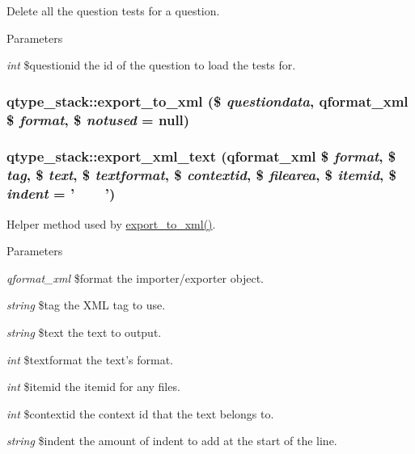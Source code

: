 \label{classqtype__stack_aa04a9197ef37eff57dca6ca2a04f5d83}
Delete all the question tests for a question. 
\begin{DoxyParams}{Parameters}
\item[{\em int}]\$questionid the id of the question to load the tests for. \end{DoxyParams}
\hypertarget{classqtype__stack_abb4e2b1212e53ee6c4a36f2315d3e085}{
\subsubsection[{export\_\-to\_\-xml}]{\setlength{\rightskip}{0pt plus 5cm}qtype\_\-stack::export\_\-to\_\-xml (\$ {\em questiondata}, \/  qformat\_\-xml \$ {\em format}, \/  \$ {\em notused} = {\ttfamily null})}}
\label{classqtype__stack_abb4e2b1212e53ee6c4a36f2315d3e085}
\hypertarget{classqtype__stack_a24ce86687f817bda0e265a8dd37889f0}{
\subsubsection[{export\_\-xml\_\-text}]{\setlength{\rightskip}{0pt plus 5cm}qtype\_\-stack::export\_\-xml\_\-text (qformat\_\-xml \$ {\em format}, \/  \$ {\em tag}, \/  \$ {\em text}, \/  \$ {\em textformat}, \/  \$ {\em contextid}, \/  \$ {\em filearea}, \/  \$ {\em itemid}, \/  \$ {\em indent} = {\ttfamily '~~~~'})}}
\label{classqtype__stack_a24ce86687f817bda0e265a8dd37889f0}
Helper method used by \hyperlink{classqtype__stack_abb4e2b1212e53ee6c4a36f2315d3e085}{export\_\-to\_\-xml()}. 
\begin{DoxyParams}{Parameters}
\item[{\em qformat\_\-xml}]\$format the importer/exporter object. \item[{\em string}]\$tag the XML tag to use. \item[{\em string}]\$text the text to output. \item[{\em int}]\$textformat the text's format. \item[{\em int}]\$itemid the itemid for any files. \item[{\em int}]\$contextid the context id that the text belongs to. \item[{\em string}]\$indent the amount of indent to add at the start of the line. \end{DoxyParams}
